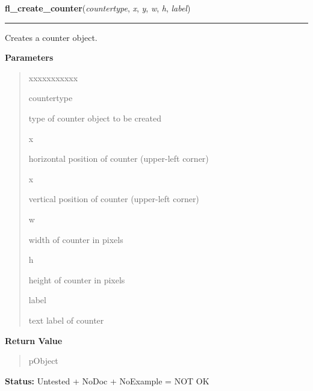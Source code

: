 \hspace{.8\funcindent}\begin{boxedminipage}{\funcwidth}

    \raggedright \textbf{fl\_create\_counter}(\textit{countertype}, \textit{x}, \textit{y}, \textit{w}, \textit{h}, \textit{label})

    \vspace{-1.5ex}

    \rule{\textwidth}{0.5\fboxrule}
\setlength{\parskip}{2ex}
    Creates a counter object.

\setlength{\parskip}{1ex}
      \textbf{Parameters}
      \vspace{-1ex}

      \begin{quote}
        \begin{Ventry}{xxxxxxxxxxx}

          \item[countertype]

          type of counter object to be created

          \item[x]

          horizontal position of counter (upper-left corner)

          \item[x]

          vertical position of counter (upper-left corner)

          \item[w]

          width of counter in pixels

          \item[h]

          height of counter in pixels

          \item[label]

          text label of counter

        \end{Ventry}

      \end{quote}

      \textbf{Return Value}
    \vspace{-1ex}

      \begin{quote}
      pObject

      \end{quote}

\textbf{Status:} Untested + NoDoc + NoExample = NOT OK



    \end{boxedminipage}

